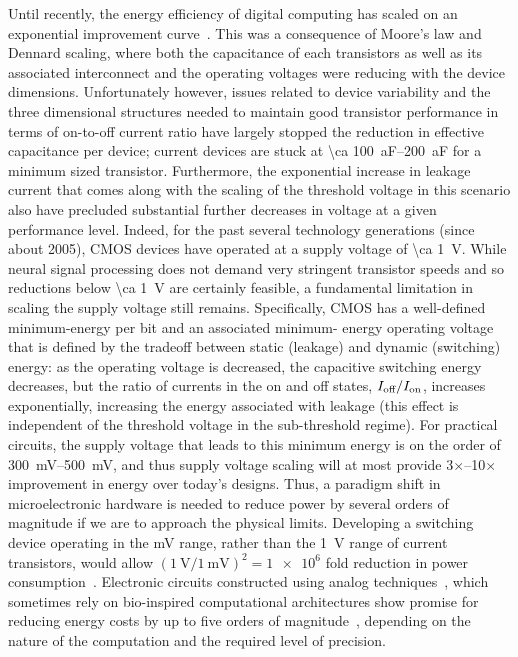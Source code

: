 Until recently, the energy efficiency of digital computing has scaled on an exponential improvement curve~\cite{koomey11}.
This was a consequence of Moore's law and Dennard scaling, where both the capacitance of each transistors as well as its associated interconnect and the operating voltages were reducing with the device dimensions.
Unfortunately however, issues related to device variability and the three dimensional structures needed to maintain good transistor performance in terms of on-to-off current ratio have largely stopped the reduction in effective capacitance per device; current devices are stuck at \SIrange{\ca 100}{200}{\atto\farad} for a minimum sized transistor.
Furthermore, the exponential increase in leakage current that comes along with the scaling of the threshold voltage in this scenario also have precluded substantial further decreases in voltage at a given performance level.
Indeed, for the past several technology generations (since about 2005), CMOS devices have operated at a supply voltage of \SI{\ca 1}{\volt}.
While neural signal processing does not demand very stringent transistor speeds and so reductions below \SI{\ca 1}{\volt} are certainly feasible, a fundamental limitation in scaling the supply voltage still remains.
Specifically, CMOS has a well-defined minimum-energy per bit and an associated minimum- energy operating voltage that is defined by the tradeoff between static (leakage) and dynamic (switching) energy:
as the operating voltage is decreased, the capacitive switching energy decreases, but the ratio of currents in the on and off states, $I_{\text{\scriptsize off}}/I_{\text{\scriptsize on}}$, increases exponentially, increasing the energy associated with leakage (this effect is independent of the threshold voltage in the sub-threshold regime).
For practical circuits, the supply voltage that leads to this minimum energy is on the order of \SIrange{300}{500}{\milli\volt}, and thus supply voltage scaling will at most provide 3$\times$--10$\times$ improvement in energy over today's designs.
Thus, a paradigm shift in microelectronic hardware is needed to reduce power by several orders of magnitude if we are to approach the physical limits.
Developing a switching device operating in the \si{\milli\volt} range, rather than the \SI{1}{\volt} range of current transistors, would allow $\left(\SI{1}{\volt}/\SI{1}{\milli\volt}\right)^2=\num{1e6}$ fold reduction in power consumption~\cite{yablonovitch08}.
Electronic circuits constructed using analog techniques~\cite{sarpeshkar98}, which sometimes rely on bio-inspired computational architectures show promise for reducing energy costs by up to five orders of magnitude~\cite{rapoport09,sarpeshkar98,mandal07}, depending on the nature of the computation and the required level of precision.

